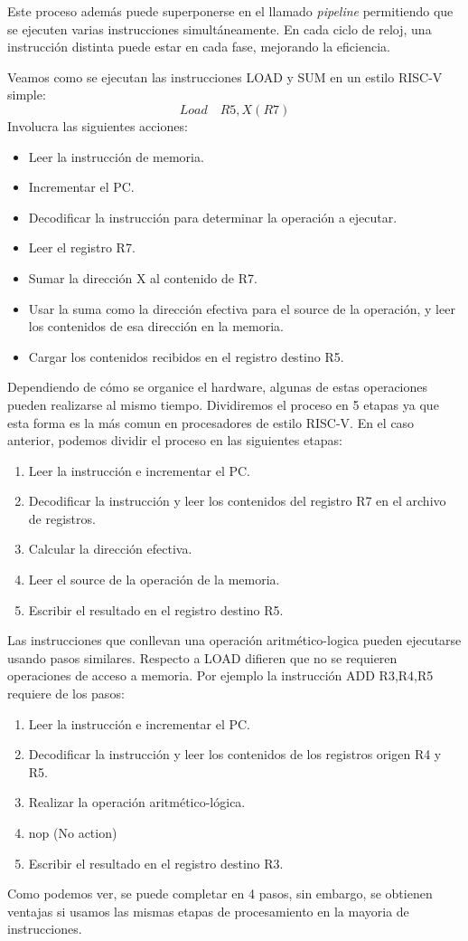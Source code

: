 Este proceso además puede superponerse en el llamado \textit{pipeline} permitiendo que se ejecuten varias instrucciones simultáneamente. En cada ciclo de reloj,
una instrucción distinta puede estar en cada fase, mejorando la eficiencia.
\begin{ejemplo}
	Veamos como se ejecutan las instrucciones LOAD y SUM en un estilo RISC-V simple:
	\begin{equation*}
		Load \quad R5, X(R7)
	\end{equation*}
	Involucra las siguientes acciones:
	\begin{itemize}
		\item Leer la instrucción de memoria.
		\item Incrementar el PC.
		\item Decodificar la instrucción para determinar la operación a ejecutar.
		\item Leer el registro R7.
		\item Sumar la dirección X al contenido de R7.
		\item Usar la suma como la dirección efectiva para el source de la operación, y leer los contenidos de
		      esa dirección en la memoria.
		\item Cargar los contenidos recibidos en el registro destino R5.
	\end{itemize}
	Dependiendo de cómo se organice el hardware, algunas de estas operaciones pueden realizarse al mismo tiempo. Dividiremos el proceso en 5 etapas ya que esta forma es la más comun en procesadores de estilo RISC-V.
	En el caso anterior, podemos dividir el proceso en las siguientes etapas:
	\begin{enumerate}
		\item Leer la instrucción e incrementar el PC.
		\item Decodificar la instrucción y leer los contenidos del registro R7 en el archivo de registros.
		\item Calcular la dirección efectiva.
		\item Leer el source de la operación de la memoria.
		\item Escribir el resultado en el registro destino R5.
	\end{enumerate}
	Las instrucciones que conllevan una operación aritmético-logica pueden ejecutarse usando pasos similares. Respecto a LOAD difieren
	que no se requieren operaciones de acceso a memoria. Por ejemplo la instrucción ADD R3,R4,R5 requiere de los pasos:
	\begin{enumerate}
		\item Leer la instrucción e incrementar el PC.
		\item Decodificar la instrucción y leer los contenidos de los registros origen R4 y R5.
		\item Realizar la operación aritmético-lógica.
		\item nop (No action)
		\item Escribir el resultado en el registro destino R3.
	\end{enumerate}
	Como podemos ver, se puede completar en 4 pasos, sin embargo, se obtienen ventajas si usamos las mismas etapas de procesamiento en la mayoria de instrucciones.
\end{ejemplo}
